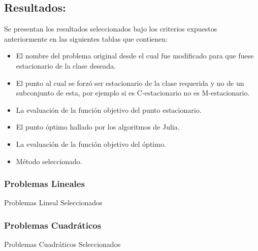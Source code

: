 \subsection{Resultados:}
Se presentan los resultados seleccionados bajo los criterios expuestos anteriormente en las siguientes tablas que contienen:
\begin{itemize}
    \item El nombre del problema original desde el cual fue modificado para que fuese estacionario de la clase deseada. 
    \item El punto al cual se forzó ser estacionario de la clase requerida y no de un subconjunto de esta, por ejemplo si es C-estacionario no es M-estacionario.
    \item La evaluación de la función objetivo del punto estacionario.
    \item El punto óptimo hallado por los algoritmos de Julia.
    \item La evaluación de la función objetivo del óptimo.
    \item Método seleccionado.
\end{itemize}

\subsubsection{Problemas Lineales} 

\begin{resultstable}{Problemas Lineal Seleccionados}
\end{resultstable}



\subsubsection{Problemas Cuadráticos}

\begin{resultstable}{Problemas Cuadráticos Seleccionados}
    \end{resultstable}
    

